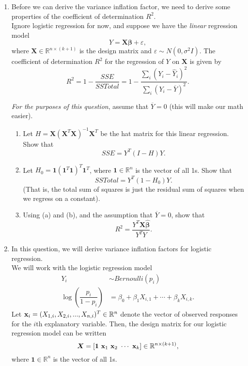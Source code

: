 \documentclass[11pt]{article}
\begin{document}
\begin{enumerate}
\item Before we can derive the variance inflation factor, we need to derive some properties of the coefficient of determination $R^2$.\\

Ignore logistic regression for now, and suppose we have the \textit{linear} regression model
$$Y = \bm{X} \bm{\beta} + \varepsilon,$$
where $\bm{X} \in \mathbb{R}^{n \times (k+1)}$ is the design matrix and $\varepsilon \sim N(0, \sigma^2 I).$ The coefficient of determination $R^2$ for the regression of $Y$ on $\bm{X}$ is given by
$$R^2 = 1 - \dfrac{SSE}{SSTotal} = 1 - \dfrac{\sum_i (Y_i - \widehat{Y}_i)^2}{\sum_i (Y_i - \overline{Y})^2}.$$

\textit{For the purposes of this question}, assume that $\overline{Y} = 0$ (this will make our math easier).

\begin{enumerate}
\item Let $H = \bm{X}(\bm{X}^T \bm{X})^{-1} \bm{X}^T$ be the hat matrix for this linear regression. Show that 
$$SSE = Y^T(I - H)Y.$$

\item Let $H_0 = \bm{1} (\bm{1}^T \bm{1})^T \bm{1}^T$, where $\bm{1} \in \mathbb{R}^n$ is the vector of all 1s. Show that
$$SSTotal = Y^T(1 - H_0)Y.$$
(That is, the total sum of squares is just the residual sum of squares when we regress on a constant).

\item Using (a) and (b), and the assumption that $\overline{Y} = 0$, show that 
$$R^2 = \dfrac{Y^T \bm{X} \widehat{\bm{\beta}}}{Y^T Y}.$$

\end{enumerate}


\item In this question, we will derive variance inflation factors for logistic regression.\\

We will work with the logistic regression model
\begin{align*}
Y_i &\sim Bernoulli(p_i) \\
\log \left( \dfrac{p_i}{1 - p_i} \right) &= \beta_0 + \beta_1 X_{i,1} + \cdots + \beta_k X_{i,k}.
\end{align*}
Let ${\bf x}_i = (X_{1,i}, X_{2,i},...,X_{n,i})^T \in \mathbb{R}^n$ denote the vector of observed responses for the $i$th explanatory variable. Then, the design matrix for our logistic regression model can be written
$$\bm{X} = [\bm{1} \ {\bf x}_1 \ {\bf x}_2 \ \cdots \ {\bf x}_k] \in \mathbb{R}^{n \times (k + 1)},$$
where $\bm{1} \in \mathbb{R}^n$ is the vector of all 1s. 


\end{enumerate}
\end{document}
